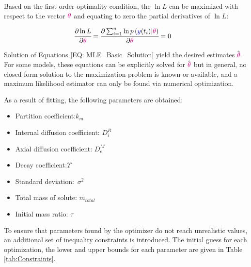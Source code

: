 \documentclass[../Article_Model_Parameters.tex]{subfiles}
\begin{document}
	Based on the first order optimality condition, the $\ln L$ can be maximized with respect to the vector ${\color{magenta} \theta}$ and equating to zero the partial derivatives of $\ln L$:
	
	{\footnotesize
		\begin{align}\label{EQ: MLE_Basic_Solution}
			\cfrac{\partial \ln L}{\partial {\color{magenta} \theta}} &= \cfrac{\partial \sum_{i=1}^{n} \ln p\left( {\color{blue}y}(t_i) | {\color{magenta} \theta} \right) }{\partial {\color{magenta} \theta}} = 0 
	\end{align} }
	
	Solution of Equations \ref{EQ: MLE_Basic_Solution} yield the desired estimates $\hat{{\color{magenta} \theta}}$. For some models, these equations can be explicitly solved for $\hat{{\color{magenta} \theta}}$ but in general, no closed-form solution to the maximization problem is known or available, and a maximum likelihood estimator can only be found via numerical optimization.
	
	As a result of fitting, the following parameters are obtained:
	
	\begin{itemize}
		\item Partition coefficient:\qquad\quad\qquad$k_m$
		\item Internal diffusion coefficient: \quad$D_i^R$
		\item Axial diffusion coefficient: \qquad$D_e^M$
		\item Decay coefficient:\qquad\qquad\qquad$\Upsilon$
		\item Standard deviation:\qquad\qquad\quad~$\sigma^2$
		\item Total mass of solute: \qquad\quad\quad$m_{total}$
		\item Initial mass ratio: \qquad\qquad\qquad$\tau$
	\end{itemize}
	
	To ensure that parameters found by the optimizer do not reach unrealistic values, an additional set of inequality constraints is introduced. The initial guess for each optimization, the lower and upper bounds for each parameter are given in Table \ref{tab:Constraints}. 
 	
 	\begin{table}[h]
		\caption{Constraints and initial guess}
		\label{tab:Constraints}
	\end{table}
	
\end{document}
